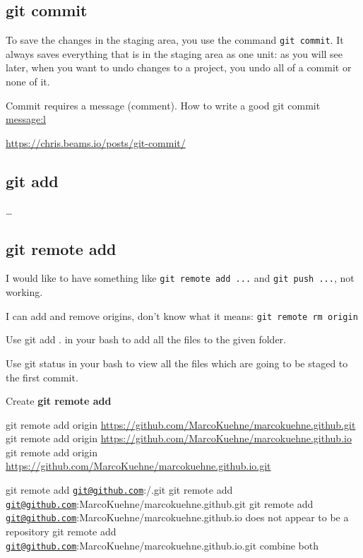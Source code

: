\documentclass[
]{book}
\begin{document}
\hypertarget{git-commit}{%
\subsection{git commit}\label{git-commit}}

To save the changes in the staging area, you use the command \texttt{git\ commit}. It always saves everything that is in the staging area as one unit: as you will see later, when you want to undo changes to a project, you undo all of a commit or none of it.

Commit requires a message (comment). How to write a good git commit \url{message:l}

\url{https://chris.beams.io/posts/git-commit/}

\hypertarget{git-add}{%
\subsection{git add}\label{git-add}}

\ldots{}

\hypertarget{git-remote-add}{%
\subsection{git remote add}\label{git-remote-add}}

I would like to have something like \texttt{git\ remote\ add\ ...} and \texttt{git\ push\ ...}, not working.

I can add and remove origins, don't know what it means: \texttt{git\ remote\ rm\ origin}

Use git add . in your bash to add all the files to the given folder.

Use git status in your bash to view all the files which are going to be staged to the first commit.

Create \textbf{git remote add}

git remote add origin \url{https://github.com/MarcoKuehne/marcokuehne.github.git}
git remote add origin \url{https://github.com/MarcoKuehne/marcokuehne.github.io}
git remote add origin \url{https://github.com/MarcoKuehne/marcokuehne.github.io.git}

git remote add \href{mailto:git@github.com}{\nolinkurl{git@github.com}}:/.git
git remote add \href{mailto:git@github.com}{\nolinkurl{git@github.com}}:MarcoKuehne/marcokuehne.github.git
git remote add \href{mailto:git@github.com}{\nolinkurl{git@github.com}}:MarcoKuehne/marcokuehne.github.io does not appear to be a repository
git remote add \href{mailto:git@github.com}{\nolinkurl{git@github.com}}:MarcoKuehne/marcokuehne.github.io.git combine both
\end{document}
